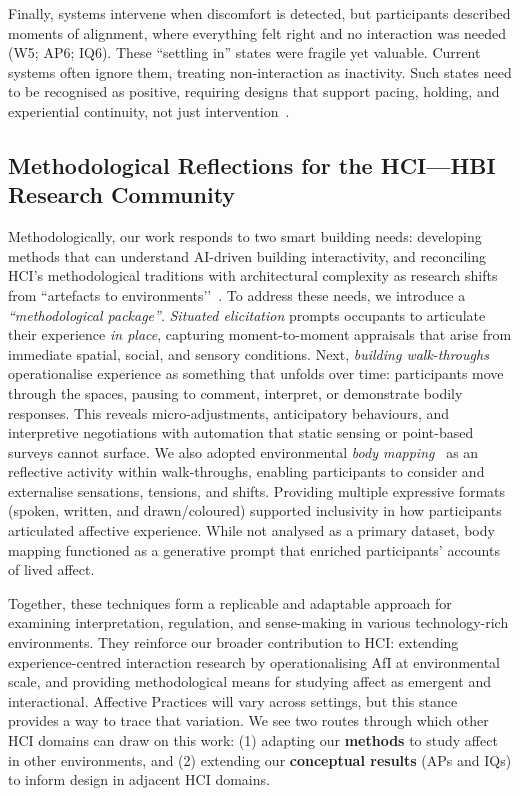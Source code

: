 Finally, systems intervene when discomfort is detected, but participants described moments of alignment, where everything felt right and no interaction was needed (W5; AP6; IQ6). These ``settling in'' states were fragile yet valuable. Current systems often ignore them, treating non-interaction as inactivity. Such states need to be recognised as positive, requiring designs that support pacing, holding, and experiential continuity, not just intervention~\cite{alavi2017comfort}.


\subsection{Methodological Reflections for the HCI---HBI Research Community}
Methodologically, our work responds to two smart building needs: developing methods that can understand AI-driven building interactivity, and reconciling HCI’s methodological traditions with architectural complexity as research shifts from ``artefacts to environments’’~\cite{alavi2019introduction}. To address these needs, we introduce a \emph{``methodological package''}. \textit{Situated elicitation} prompts occupants to articulate their experience \emph{in place}, capturing moment-to-moment appraisals that arise from immediate spatial, social, and sensory conditions. Next, \textit{building walk-throughs} operationalise experience as something that unfolds over time: participants move through the spaces, pausing to comment, interpret, or demonstrate bodily responses. This reveals micro-adjustments, anticipatory behaviours, and interpretive negotiations with automation that static sensing or point-based surveys cannot surface. We also adopted environmental \textit{body mapping}~\cite{turmo2023towards} as an reflective activity within walk-throughs, enabling participants to consider and externalise sensations, tensions, and shifts. Providing multiple expressive formats (spoken, written, and drawn/coloured) supported inclusivity in how participants articulated affective experience. While not analysed as a primary dataset, body mapping functioned as a generative prompt that enriched participants’ accounts of lived affect.

Together, these techniques form a replicable and adaptable approach for examining interpretation, regulation, and sense-making in various technology-rich environments. They reinforce our broader contribution to HCI: extending experience-centred interaction research by operationalising AfI at environmental scale, and providing methodological means for studying affect as emergent and interactional. Affective Practices will vary across settings, but this stance provides a way to trace that variation. We see two routes through which other HCI domains can draw on this work: (1) adapting our \textbf{methods} to study affect in other environments, and (2) extending our \textbf{conceptual results} (APs and IQs) to inform design in adjacent HCI domains.


